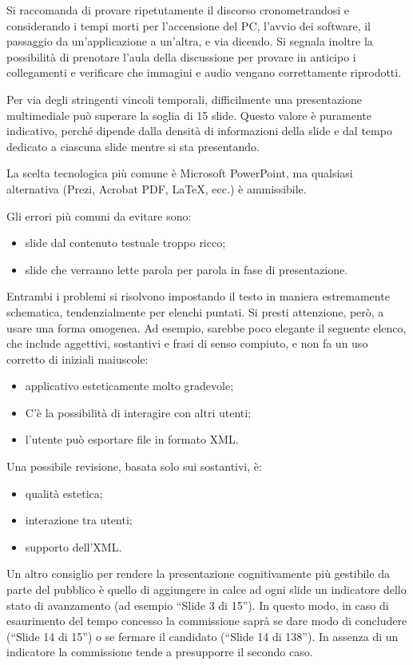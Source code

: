 \documentclass[12pt]{report}
\begin{document}
Si raccomanda di provare ripetutamente il discorso cronometrandosi e considerando i tempi morti per l'accensione del PC, l'avvio dei software, il passaggio da un'applicazione a un'altra, e via dicendo. Si segnala inoltre la possibilità di prenotare l'aula della discussione per provare in anticipo i collegamenti e verificare che immagini e audio vengano correttamente riprodotti.

Per via degli stringenti vincoli temporali, difficilmente una presentazione multimediale può superare la soglia di 15 slide. Questo valore è puramente indicativo, perché dipende dalla densità di informazioni della slide e dal tempo dedicato a ciascuna slide mentre si sta presentando.

La scelta tecnologica più comune è Microsoft PowerPoint, ma qualsiasi alternativa (Prezi, Acrobat PDF, \LaTeX, ecc.) è ammissibile.

Gli errori più comuni da evitare sono:
\begin{itemize}
    \item slide dal contenuto testuale troppo ricco;
    \item slide che verranno lette parola per parola in fase di presentazione.
\end{itemize}

Entrambi i problemi si risolvono impostando il testo in maniera estremamente schematica, tendenzialmente per elenchi puntati. Si presti attenzione, però, a usare una forma omogenea.
Ad esempio, sarebbe poco elegante il seguente elenco, che include aggettivi, sostantivi e frasi di senso compiuto, e non fa un uso corretto di iniziali maiuscole:
\begin{itemize}
    \item applicativo esteticamente molto gradevole;
    \item C'è la possibilità di interagire con altri utenti;
    \item l'utente può esportare file in formato XML.
\end{itemize}

Una possibile revisione, basata solo sui sostantivi, è:
\begin{itemize}
    \item qualità estetica;
    \item interazione tra utenti;
    \item supporto dell'XML.
\end{itemize}

Un altro consiglio per rendere la presentazione cognitivamente più gestibile da parte del pubblico è quello di aggiungere in calce ad ogni slide un indicatore dello stato di avanzamento (ad esempio ``Slide 3 di 15''). In questo modo, in caso di esaurimento del tempo concesso la commissione saprà se dare modo di concludere (``Slide 14 di 15'') o se fermare il candidato (``Slide 14 di 138''). In assenza di un indicatore la commissione tende a presupporre il secondo caso.
\end{document}
